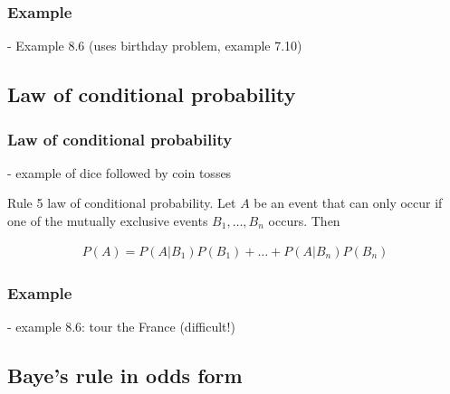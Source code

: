 \begin{frame}
    \frametitle{Example}

- Example 8.6 (uses birthday problem, example 7.10)

\end{frame}

\subsection{Law of conditional probability}

\begin{frame}
    \frametitle{Law of conditional probability}

- example of dice followed by coin tosses

    \begin{description}

        \item{Rule 5} law of conditional probability. Let $A$ be an event that
            can only occur if one of the mutually exclusive events
            $B_1,\ldots,B_n$ occurs. Then

            \begin{align*}
                P(A) = P(A|B_1) P(B_1) + \ldots + P(A|B_n) P(B_n)  
            \end{align*}

    \end{description}

\end{frame}

\begin{frame}
    \frametitle{Example}

- example 8.6: tour the France (difficult!)

\end{frame}

\subsection{Baye's rule in odds form}


